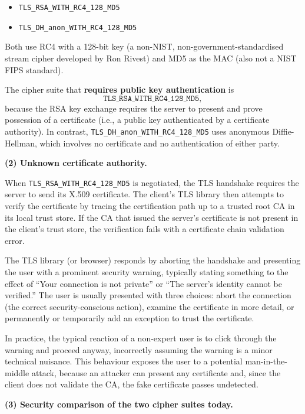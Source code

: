 \documentclass[]{scrartcl}
\begin{document}
{\begin{itemize}
    \item \texttt{TLS\_RSA\_WITH\_RC4\_128\_MD5}
    \item \texttt{TLS\_DH\_anon\_WITH\_RC4\_128\_MD5}
\end{itemize}

Both use RC4 with a 128-bit key (a non-NIST, non-government-standardised stream cipher
developed by Ron Rivest) and MD5 as the MAC (also not a NIST FIPS standard).

The cipher suite that \textbf{requires public key authentication} is
\[
\texttt{TLS\_RSA\_WITH\_RC4\_128\_MD5},
\]
because the RSA key exchange requires the server to present and prove possession of a
certificate (i.e., a public key authenticated by a certificate authority).
In contrast, \texttt{TLS\_DH\_anon\_WITH\_RC4\_128\_MD5} uses anonymous Diffie-Hellman,
which involves no certificate and no authentication of either party.

\medskip
\textbf{(2) Unknown certificate authority.}

When \texttt{TLS\_RSA\_WITH\_RC4\_128\_MD5} is negotiated, the TLS handshake requires
the server to send its X.509 certificate.
The client's TLS library then attempts to verify the certificate by tracing the
certification path up to a trusted root CA in its local trust store.
If the CA that issued the server's certificate is not present in the client's trust
store, the verification fails with a certificate chain validation error.

The TLS library (or browser) responds by aborting the handshake and presenting
the user with a prominent security warning, typically stating something to the effect
of ``Your connection is not private'' or ``The server's identity cannot be verified.''
The user is usually presented with three choices: abort the connection (the correct
security-conscious action), examine the certificate in more detail, or permanently or
temporarily add an exception to trust the certificate.

In practice, the typical reaction of a non-expert user is to click through the warning
and proceed anyway, incorrectly assuming the warning is a minor technical nuisance.
This behaviour exposes the user to a potential man-in-the-middle attack, because an
attacker can present any certificate and, since the client does not validate the CA, the
fake certificate passes undetected.

\medskip
\textbf{(3) Security comparison of the two cipher suites today.}

}
\end{document}
